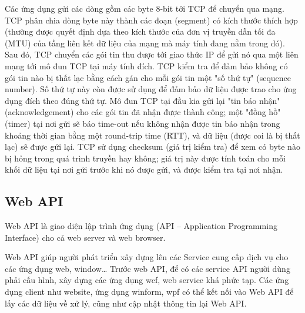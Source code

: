 Các ứng dụng gửi các dòng gồm các byte 8-bit tới TCP để chuyển qua mạng. TCP phân chia dòng byte này thành các đoạn (segment) có kích thước thích hợp (thường được quyết định dựa theo kích thước của đơn vị truyền dẫn tối đa (MTU) của tầng liên kết dữ liệu của mạng mà máy tính đang nằm trong đó). Sau đó, TCP chuyển các gói tin thu được tới giao thức IP để gửi nó qua một liên mạng tới mô đun TCP tại máy tính đích. TCP kiểm tra để đảm bảo không có gói tin nào bị thất lạc bằng cách gán cho mỗi gói tin một "số thứ tự" (sequence number). Số thứ tự này còn được sử dụng để đảm bảo dữ liệu được trao cho ứng dụng đích theo đúng thứ tự. Mô đun TCP tại đầu kia gửi lại "tin báo nhận" (acknowledgement) cho các gói tin đã nhận được thành công; một "đồng hồ" (timer) tại nơi gửi sẽ báo time-out nếu không nhận được tin báo nhận trong khoảng thời gian bằng một round-trip time (RTT), và dữ liệu (được coi là bị thất lạc) sẽ được gửi lại. TCP sử dụng checksum (giá trị kiểm tra) để xem có byte nào bị hỏng trong quá trình truyền hay không; giá trị này được tính toán cho mỗi khối dữ liệu tại nơi gửi trước khi nó được gửi, và được kiểm tra tại nơi nhận.

\subsection{Web API} 

Web API là giao diện lập trình ứng dụng (API – Application Programming Interface) cho cả web server và web browser.\cite{c2api}

Web API giúp người phát triển xây dựng lên các Service cung cấp dịch vụ cho các ứng dụng web, window… Trước web API, để có các service API người dùng phải cấu hình, xây dựng các ứng dụng wcf, web service khá phức tạp. Các ứng dụng client như website, ứng dụng winform, wpf có thể kết nối vào Web API để lấy các dữ liệu về xử lý, cũng như cập nhật thông tin lại Web API.


